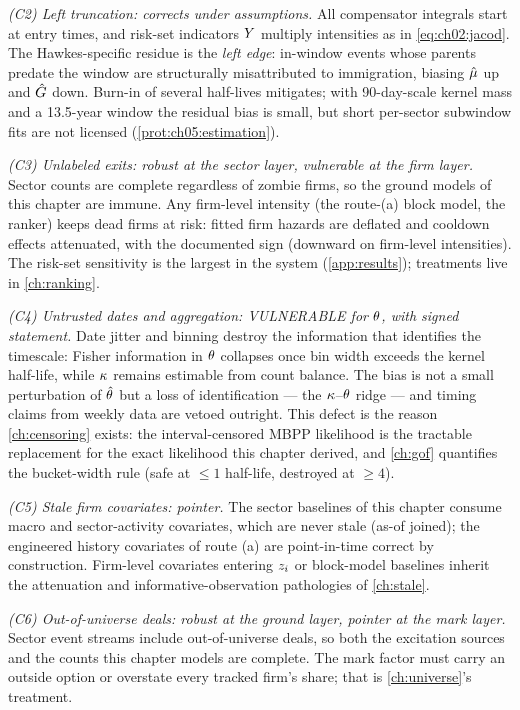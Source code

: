 \emph{(C2) Left truncation: corrects under assumptions.} All compensator
integrals start at entry times, and risk-set indicators $Y$
multiply intensities as in \cref{eq:ch02:jacod}. The Hawkes-specific
residue is the \emph{left edge}: in-window events whose parents predate
the window are structurally misattributed to immigration, biasing
$\hat{\mu}$ up and $\hat{G}$ down. Burn-in of several half-lives
mitigates; with 90-day-scale kernel mass and a 13.5-year window the
residual bias is small, but short per-sector subwindow fits are not
licensed (\cref{prot:ch05:estimation}).

\emph{(C3) Unlabeled exits: robust at the sector layer, vulnerable at the
firm layer.} Sector counts are complete regardless of zombie firms, so
the ground models of this chapter are immune. Any firm-level intensity
(the route-(a) block model, the ranker) keeps dead firms at risk:
fitted firm hazards are deflated and cooldown effects attenuated, with
the documented sign (downward on firm-level intensities). The
risk-set sensitivity is the largest in the system
(\cref{app:results}); treatments live in \cref{ch:ranking}.

\emph{(C4) Untrusted dates and aggregation: VULNERABLE for $\theta$, with
signed statement.} Date jitter and binning destroy the information that
identifies the timescale: Fisher information in $\theta$ collapses once
bin width exceeds the kernel half-life, while $\kappa$ remains estimable
from count balance. The bias is not a small perturbation of $\hat{\theta}$
but a loss of identification --- the $\kappa$--$\theta$ ridge --- and
timing claims from weekly data are vetoed outright. This defect is the
reason \cref{ch:censoring} exists: the interval-censored MBPP likelihood
is the tractable replacement for the exact likelihood this chapter
derived, and \cref{ch:gof} quantifies the bucket-width rule (safe at
$\le 1$ half-life, destroyed at $\ge 4$).

\emph{(C5) Stale firm covariates: pointer.} The sector baselines of this
chapter consume macro and sector-activity covariates, which are never
stale (as-of joined); the engineered history covariates of route (a) are
point-in-time correct by construction. Firm-level covariates entering
$z_i$ or block-model baselines inherit the attenuation and
informative-observation pathologies of \cref{ch:stale}.

\emph{(C6) Out-of-universe deals: robust at the ground layer, pointer at
the mark layer.} Sector event streams include out-of-universe deals, so
both the excitation sources and the counts this chapter models are
complete. The mark factor must carry an outside option or overstate every
tracked firm's share; that is \cref{ch:universe}'s treatment.

